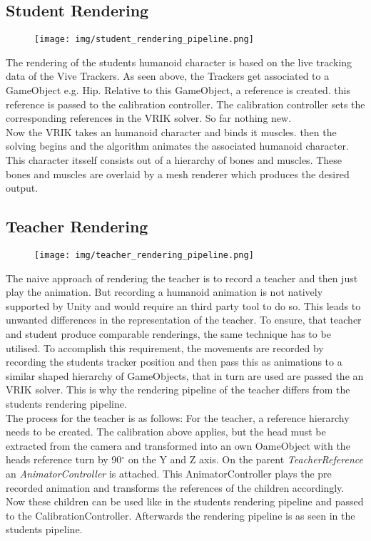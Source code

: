 \subsection{Student Rendering}
\begin{figure}
	\centering
	\texttt{[image: img/student\_rendering\_pipeline.png]}
	\caption{}
	\label{fig:student_rendering_pipeline}
\end{figure}
The rendering of the students humanoid character is based on the live tracking data of the Vive Trackers. As seen above, the Trackers get associated to a GameObject e.g. Hip. Relative to this GameObject, a reference is created. this reference is passed to the calibration controller. The calibration controller sets the corresponding references in the VRIK solver. So far nothing new.\\
Now the VRIK takes an humanoid character and binds it muscles. then the solving begins and the algorithm animates the associated humanoid character. This character itsself consists out of a hierarchy of bones and muscles. These bones and muscles are overlaid by a mesh renderer which produces the desired output.%
\subsection{Teacher Rendering}
\begin{figure}
	\centering
	\texttt{[image: img/teacher\_rendering\_pipeline.png]}
	\caption{}
	\label{fig:teacher_rendering_pipeline}
\end{figure}
The naive approach of rendering the teacher is to record a teacher and then just play the animation. But recording a humanoid animation is not natively supported by Unity and would require an third party tool to do so. This leads to unwanted differences in the representation of the teacher. To ensure, that teacher and student produce comparable renderings, the same technique has to be utilised. To accomplish this requirement, the movements are recorded by recording the students tracker position and then pass this as animations to a similar shaped hierarchy of GameObjects, that in turn are used are passed the an VRIK solver. This is why the rendering pipeline of the teacher differs from the students rendering pipeline.\\
The process for the teacher is as follows:
For the teacher, a reference hierarchy needs to be created. The calibration above applies, but the head must be extracted from the camera and transformed into an own OameObject with the heads reference turn by 90$^\circ$ on the Y and Z axis. On the parent \textit{TeacherReference} an \textit{AnimatorController} is attached. This AnimatorController plays the pre recorded animation and transforms the references of the children accordingly. Now these children can be used like in the students rendering pipeline and passed to the CalibrationController. Afterwards the rendering pipeline is as seen in the students pipeline.%
